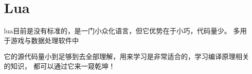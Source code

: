 \clearpage
\part{Lua}

lua目前是没有标准的，是一门小众化语言，但它优势在于小巧，代码量少。
多用于游戏与数据处理软件中

它的源代码量小到足够到去全部理解，用来学习是非常适合的，学习编译原理相关的知识，
都可以通过它来一窥乾坤！


